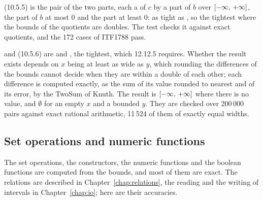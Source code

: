 \documentclass[12pt,a4paper,twoside,openright]{book}
\begin{document}
\medskip
{} (10.5.5) is the pair of the two parts, each a
 of $c$ by a part of $b$ over $[-\infty,\,+\infty]$, the
part of $b$ at most $0$ and the part at least $0$:\newinvfive{} as tight as
, so the tightest where the bounds of the quotients are
doubles. The test  checks it against exact
quotients, and the 172 cases of ITF1788 pass.

 and  (10.5.6) are
 and , the tightest,
which 12.12.5 requires. Whether the result exists depends on $x$ being at
least as wide as $y$, which rounding the differences of the bounds cannot
decide when they are within a double of each other; each difference is
computed exactly, as the sum of its value rounded to nearest and of its
error, by the TwoSum of Knuth. The result is $[-\infty,\,+\infty]$
where there is no value, and $\emptyset$ for an empty $x$ and a bounded
$y$. They are checked over 200\,000 pairs against exact rational
arithmetic, 11\,524 of them of exactly equal widths.\newinvfive

\subsection{Set operations and numeric functions}\label{sec:accuracy-set}

The set operations, the constructors, the numeric functions and the
boolean functions are computed from the bounds, and most of them are
exact. The relations are described in Chapter~\ref{chap:relations}, the
reading and the writing of intervals in Chapter~\ref{chap:io}; here are
their accuracies.
\end{document}
